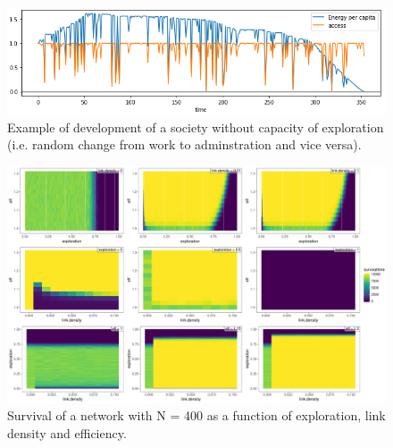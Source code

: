 
\begin{figure}[htb]
    \centering
    \includegraphics[width=\linewidth]{../figures/network_dev_noexplore.png}
    \caption{Example of development of a society without capacity of exploration (i.e. random change from work to adminstration and vice versa). }
    \label{fig:baseNetworkDev}
\end{figure}

\begin{figure}[htb]
    \centering
    \includegraphics[width = \linewidth]{../figures/survivaltime.pdf}
    \caption{Survival of a network with N = 400 as a function of exploration, link density and efficiency.}
    \label{fig:survival}
\end{figure}

